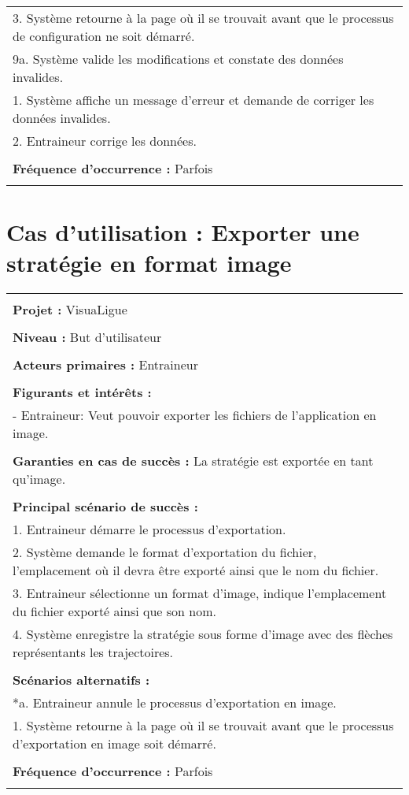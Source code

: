 \begin{longtable}{|p{16cm}|}
	\hspace{1cm}3. Système retourne à la page où il se trouvait avant que le processus de configuration ne soit démarré.\\
	9a. Système valide les modifications et constate des données invalides.\\
	\hspace{1cm}1. Système affiche un message d'erreur et demande de corriger les données invalides.\\
	\hspace{1cm}2. Entraineur corrige les données.\\
	\\
	\textbf{Fréquence d'occurrence :} Parfois\\
	\\
	\hline
\end{longtable}


\section{Cas d'utilisation : Exporter une stratégie en format image}
\begin{longtable}{|p{16cm}|}
	\hline
	\\
	\textbf{Projet :} VisuaLigue\\
	\\
	\textbf{Niveau :} But d'utilisateur\\
	\\
	\textbf{Acteurs primaires :} Entraineur\\
	\\
	\textbf{Figurants et intérêts :} \\
	- Entraineur: Veut pouvoir exporter les fichiers de l'application en image.\\
	\\
	\textbf{Garanties en cas de succès :} La stratégie est exportée en tant qu'image.\\
	\\
	\textbf{Principal scénario de succès :}\\
	1. Entraineur démarre le processus d'exportation.\\
	2. Système demande le format d'exportation du fichier, l'emplacement où il devra être exporté ainsi que le nom du fichier.\\
	3. Entraineur sélectionne un format d'image, indique l'emplacement du fichier exporté ainsi que son nom.\\
	4. Système enregistre la stratégie sous forme d'image avec des flèches représentants les trajectoires.\\
	\\
	\textbf{Scénarios alternatifs :}\\
	*a. Entraineur annule le processus d'exportation en image.\\
	\hspace{1cm}1. Système retourne à la page où il se trouvait avant que le processus d'exportation en image soit démarré.\\
	\\
	\textbf{Fréquence d'occurrence :} Parfois\\
	\\
	\hline
\end{longtable}